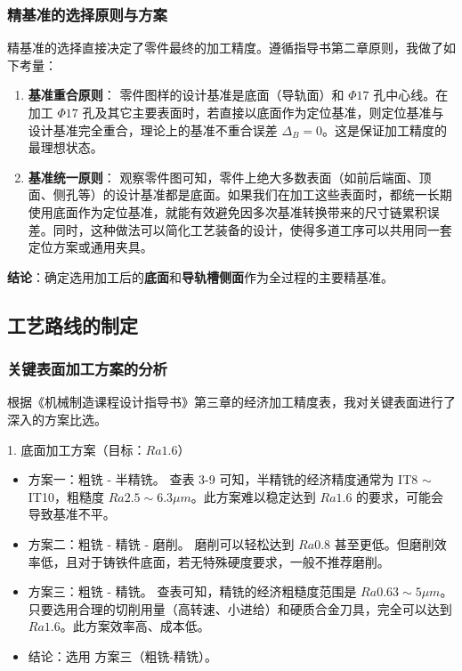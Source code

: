 \documentclass[withoutpreface,bwprint]{cumcmthesis}
\begin{document}
\subsubsection{精基准的选择原则与方案}
精基准的选择直接决定了零件最终的加工精度。遵循指导书第二章原则，我做了如下考量：
\begin{enumerate}
    \item \textbf{基准重合原则}：
    零件图样的设计基准是底面（导轨面）和 $\Phi17$ 孔中心线。在加工 $\Phi17$ 孔及其它主要表面时，若直接以底面作为定位基准，则定位基准与设计基准完全重合，理论上的基准不重合误差 $\Delta_B = 0$。这是保证加工精度的最理想状态。
    \item \textbf{基准统一原则}：
    观察零件图可知，零件上绝大多数表面（如前后端面、顶面、侧孔等）的设计基准都是底面。如果我们在加工这些表面时，都统一长期使用底面作为定位基准，就能有效避免因多次基准转换带来的尺寸链累积误差。同时，这种做法可以简化工艺装备的设计，使得多道工序可以共用同一套定位方案或通用夹具。
\end{enumerate}
\textbf{结论}：确定选用加工后的\textbf{底面}和\textbf{导轨槽侧面}作为全过程的主要精基准。

\subsection{工艺路线的制定}

\subsubsection{关键表面加工方案的分析}
根据《机械制造课程设计指导书》第三章的经济加工精度表，我对关键表面进行了深入的方案比选。

1. 底面加工方案（目标：$Ra 1.6$）
\begin{itemize}
    \item 方案一：粗铣 - 半精铣。
    查表 3-9 可知，半精铣的经济精度通常为 IT8 $\sim$ IT10，粗糙度 $Ra 2.5 \sim 6.3 \mu m$。此方案难以稳定达到 $Ra 1.6$ 的要求，可能会导致基准不平。
    \item 方案二：粗铣 - 精铣 - 磨削。
    磨削可以轻松达到 $Ra 0.8$ 甚至更低。但磨削效率低，且对于铸铁件底面，若无特殊硬度要求，一般不推荐磨削。
    \item 方案三：粗铣 - 精铣。
    查表可知，精铣的经济粗糙度范围是 $Ra 0.63 \sim 5 \mu m$。只要选用合理的切削用量（高转速、小进给）和硬质合金刀具，完全可以达到 $Ra 1.6$。此方案效率高、成本低。
    \item 结论：选用 方案三（粗铣-精铣）。
\end{itemize}
\end{document}
